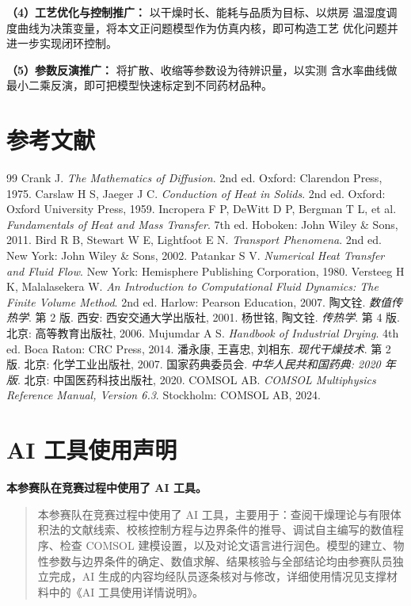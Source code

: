 \documentclass[12pt,a4paper]{article}
\begin{document}
\begin{center}
\textbf{（4）工艺优化与控制推广：} 以干燥时长、能耗与品质为目标、以烘房
温湿度调度曲线为决策变量，将本文正问题模型作为仿真内核，即可构造工艺
优化问题并进一步实现闭环控制。

\textbf{（5）参数反演推广：} 将扩散、收缩等参数设为待辨识量，以实测
含水率曲线做最小二乘反演，即可把模型快速标定到不同药材品种。


\label{endofbody}
\clearpage
\section{参考文献}

\begin{thebibliography}{99}
 Crank J. \emph{The Mathematics of Diffusion}. 2nd ed. Oxford: Clarendon Press, 1975.
 Carslaw H S, Jaeger J C. \emph{Conduction of Heat in Solids}. 2nd ed. Oxford: Oxford University Press, 1959.
 Incropera F P, DeWitt D P, Bergman T L, et al. \emph{Fundamentals of Heat and Mass Transfer}. 7th ed. Hoboken: John Wiley \& Sons, 2011.
 Bird R B, Stewart W E, Lightfoot E N. \emph{Transport Phenomena}. 2nd ed. New York: John Wiley \& Sons, 2002.
 Patankar S V. \emph{Numerical Heat Transfer and Fluid Flow}. New York: Hemisphere Publishing Corporation, 1980.
 Versteeg H K, Malalasekera W. \emph{An Introduction to Computational Fluid Dynamics: The Finite Volume Method}. 2nd ed. Harlow: Pearson Education, 2007.
 陶文铨. \emph{数值传热学}. 第 2 版. 西安: 西安交通大学出版社, 2001.
 杨世铭, 陶文铨. \emph{传热学}. 第 4 版. 北京: 高等教育出版社, 2006.
 Mujumdar A S. \emph{Handbook of Industrial Drying}. 4th ed. Boca Raton: CRC Press, 2014.
 潘永康, 王喜忠, 刘相东. \emph{现代干燥技术}. 第 2 版. 北京: 化学工业出版社, 2007.
 国家药典委员会. \emph{中华人民共和国药典: 2020 年版}. 北京: 中国医药科技出版社, 2020.
 COMSOL AB. \emph{COMSOL Multiphysics Reference Manual, Version 6.3}. Stockholm: COMSOL AB, 2024.
\end{thebibliography}

\section*{AI 工具使用声明}

\noindent\textbf{本参赛队在竞赛过程中使用了 AI 工具。}

\begin{quote}
本参赛队在竞赛过程中使用了 AI 工具，主要用于：查阅干燥理论与有限体积法的文献线索、校核控制方程与边界条件的推导、调试自主编写的数值程序、检查 COMSOL 建模设置，以及对论文语言进行润色。模型的建立、物性参数与边界条件的确定、数值求解、结果核验与全部结论均由参赛队员独立完成，AI 生成的内容均经队员逐条核对与修改，详细使用情况见支撑材料中的《AI 工具使用详情说明》。
\end{quote}
\clearpage
\appendix


\end{center}
\end{document}
